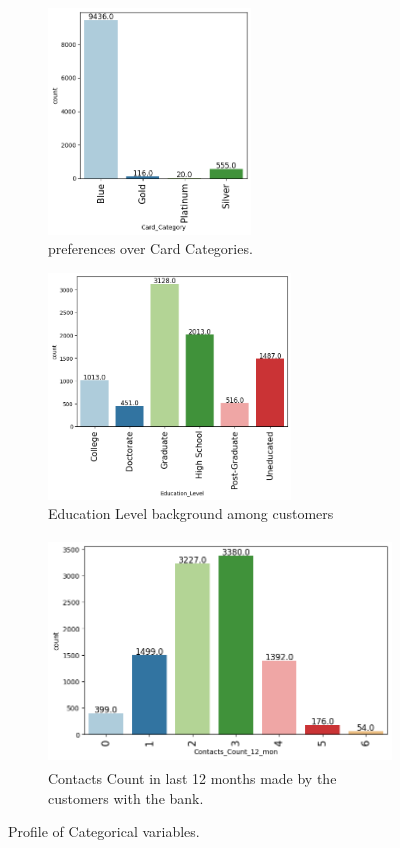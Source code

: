 \documentclass[10pt,a4paper]{style}
\begin{document}
\begin{figure}[h]
\begin{subfigure}[t]{0.3\textwidth}
			\label{fig:Dependent_count}
		\end{subfigure}
		\hfill
		\begin{subfigure}[t]{0.3\textwidth}
			\includegraphics[width=\textwidth,height=6cm]{Card_Category.png}
			\caption{preferences over Card Categories.}
			\label{fig:Card_Category}
		\end{subfigure}
		\hfill
		\begin{subfigure}[t]{0.3\textwidth}
			\includegraphics[width=\textwidth,height=6cm]{Education_Level.png}
			\caption{Education Level background among customers}
			\label{fig:Education_Level}
		\end{subfigure}
		\hfill
		\begin{subfigure}[t]{0.3\textwidth}
			\includegraphics[width=\textwidth,height=6cm]{Contacts_Count_12_mon.png}
			\caption{Contacts Count in last 12 months made by the customers with the bank.}
			\label{fig:Contacts_Count_12_mon}
		\end{subfigure}
		\caption{Profile of Categorical variables.}
		\label{fig:Categorical variable profile}
	\end{figure}
\end{document}
